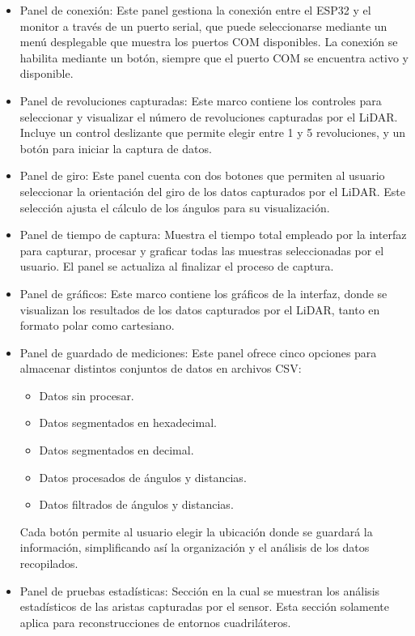 \begin{itemize}
	\item  Panel de conexión: Este panel gestiona la conexión entre el ESP32 y el monitor a través de un puerto serial, que puede seleccionarse mediante un menú desplegable que muestra los puertos COM disponibles. La conexión se habilita mediante un botón, siempre que el puerto COM se encuentra activo y disponible. 
	\item Panel de revoluciones capturadas: Este marco contiene los controles para seleccionar y visualizar el número de revoluciones capturadas por el LiDAR. Incluye un control deslizante que permite elegir entre 1 y 5 revoluciones, y un botón para iniciar la captura de datos.
	\item Panel de giro: Este panel cuenta con dos botones que permiten al usuario seleccionar la orientación del giro  de los datos capturados por el LiDAR. Este selección ajusta el cálculo de los ángulos para su visualización.
	\item Panel de tiempo de captura: Muestra el tiempo total empleado por la interfaz para capturar, procesar y graficar todas las muestras seleccionadas por el usuario. El panel se actualiza al finalizar el proceso de captura.
	\item Panel de gráficos: Este marco contiene los gráficos de la interfaz, donde se visualizan los resultados de los datos capturados por el LiDAR, tanto en formato polar como cartesiano.
	\item Panel de guardado de mediciones: Este panel ofrece cinco opciones para almacenar distintos conjuntos de datos en archivos CSV:
	\begin{itemize}
		\item Datos sin procesar.
		\item Datos segmentados en hexadecimal.
		\item Datos segmentados en decimal.
		\item Datos procesados de ángulos y distancias.
		\item Datos filtrados de ángulos y distancias. 
	\end{itemize}
	Cada botón permite al usuario elegir la ubicación donde se guardará la información, simplificando así la organización y el análisis de los datos recopilados.
	\item Panel de pruebas estadísticas: Sección en la cual se muestran los análisis estadísticos de las aristas capturadas por el sensor. Esta sección solamente aplica para reconstrucciones de entornos cuadriláteros.
\end{itemize}

